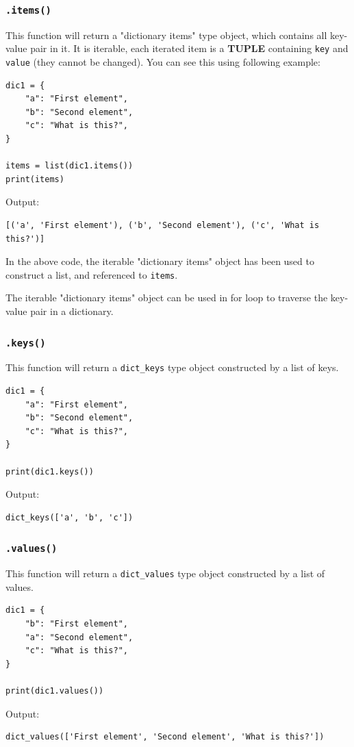 \documentclass[12pt]{book}
\begin{document}
\subsubsection{\texttt{.items()}}
\label{sec:orgd833c50}
This function will return a "dictionary items" type object, which contains all key-value pair in it. It is iterable, each iterated item is a \textbf{TUPLE} containing \texttt{key} and \texttt{value} (they cannot be changed). You can see this using following example:
\begin{verbatim}
dic1 = {
    "a": "First element",
    "b": "Second element",
    "c": "What is this?",
}

items = list(dic1.items())
print(items)
\end{verbatim}
Output:
\begin{verbatim}
[('a', 'First element'), ('b', 'Second element'), ('c', 'What is this?')]
\end{verbatim}
In the above code, the iterable "dictionary items" object has been used to construct a list, and referenced to \texttt{items}.

The iterable "dictionary items" object can be used in for loop to traverse the key-value pair in a dictionary.
\subsubsection{\texttt{.keys()}}
\label{sec:org0fa6110}
This function will return a \texttt{dict\_keys} type object constructed by a list of keys.
\begin{verbatim}
dic1 = {
    "a": "First element",
    "b": "Second element",
    "c": "What is this?",
}

print(dic1.keys())
\end{verbatim}
Output:
\begin{verbatim}
dict_keys(['a', 'b', 'c'])
\end{verbatim}
\subsubsection{\texttt{.values()}}
\label{sec:org26b549a}
This function will return a \texttt{dict\_values} type object constructed by a list of values.
\begin{verbatim}
dic1 = {
    "b": "First element",
    "a": "Second element",
    "c": "What is this?",
}

print(dic1.values())
\end{verbatim}
Output:
\begin{verbatim}
dict_values(['First element', 'Second element', 'What is this?'])
\end{verbatim}
\end{document}
